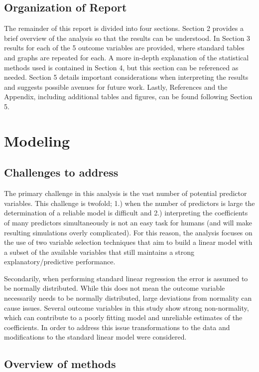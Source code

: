 \documentclass{article}
\begin{document}
\subsection{Organization of Report}

The remainder of this report is divided into four sections. Section 2 provides a brief overview of the analysis so that the results can be understood. In Section 3 results for each of the 5 outcome variables are provided, where standard tables and graphs are repeated for each. A more in-depth explanation of the statistical methods used is contained in Section 4, but this section can be referenced as needed. Section 5 details important considerations when interpreting the results and suggests possible avenues for future work. Lastly, References and the Appendix, including additional tables and figures, can be found following Section 5.

\section{Modeling}
\subsection{Challenges to address}

The primary challenge in this analysis is the vast number of potential predictor variables. This challenge is twofold; 1.) when 
the number of predictors is large the determination of a reliable model is difficult and 2.) interpreting the coefficients of many 
predictors simultaneously is not an easy task for humans (and will make resulting simulations overly complicated). For this 
reason, the analysis focuses on the use of two variable selection techniques that aim to build a linear model with a subset of 
the available variables that still maintains a strong explanatory/predictive performance.

Secondarily, when performing standard linear regression the error is assumed to be normally distributed.  While this does not 
mean the outcome variable necessarily needs to be normally distributed, large deviations from normality can cause issues. 
Several outcome variables in this study show strong non-normality, which can contribute to a poorly fitting model and unreliable estimates of the coefficients. In order to address this issue transformations to the data and modifications to the standard linear model were considered.

\subsection{Overview of methods}
\end{document}
